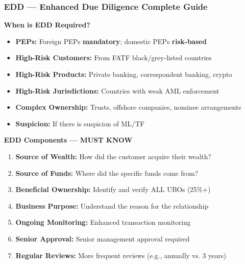 \documentclass[12pt,aspectratio=169]{beamer}
\renewcommand{\scriptsize}{\fontsize{4.5}{5.5}\selectfont}
\begin{document}
	\begin{frame}
		\frametitle{\fontsize{11}{13}\selectfont \textbf{EDD — Enhanced Due Diligence Complete Guide}}
		\begin{block}{\fontsize{7}{9}\selectfont \textbf{When is EDD Required?}}
			\scriptsize
			\begin{itemize}
				\item \textbf{PEPs:} Foreign PEPs \textbf{mandatory}; domestic PEPs \textbf{risk-based}
				\item \textbf{High-Risk Customers:} From FATF black/grey-listed countries
				\item \textbf{High-Risk Products:} Private banking, correspondent banking, crypto
				\item \textbf{High-Risk Jurisdictions:} Countries with weak AML enforcement
				\item \textbf{Complex Ownership:} Trusts, offshore companies, nominee arrangements
				\item \textbf{Suspicion:} If there is suspicion of ML/TF
			\end{itemize}
		\end{block}
		\vspace{0.02cm}
		\begin{block}{\fontsize{7}{9}\selectfont \textbf{EDD Components — MUST KNOW}}
			\scriptsize
			\begin{enumerate}
				\item \textbf{Source of Wealth:} How did the customer acquire their wealth?
				\item \textbf{Source of Funds:} Where did the specific funds come from?
				\item \textbf{Beneficial Ownership:} Identify and verify ALL UBOs (25\%+)
				\item \textbf{Business Purpose:} Understand the reason for the relationship
				\item \textbf{Ongoing Monitoring:} Enhanced transaction monitoring
				\item \textbf{Senior Approval:} Senior management approval required
				\item \textbf{Regular Reviews:} More frequent reviews (e.g., annually vs. 3 years)
			\end{enumerate}
		\end{block}
		\vspace{0.02cm}

\end{frame}
\end{document}

